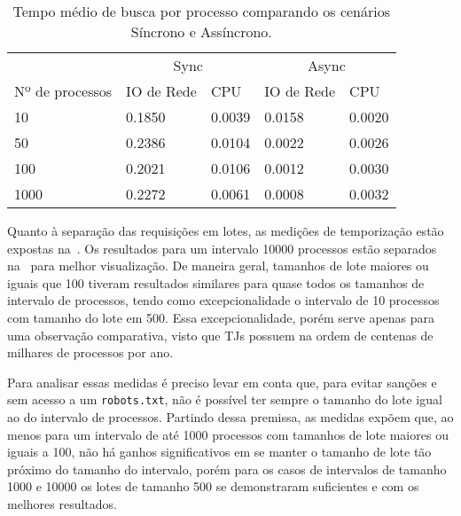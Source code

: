 \begin{table}[htb]
  \centering
  \begin{tabular}{lllll}
    \toprule
     & \multicolumn{2}{c}{Sync} & \multicolumn{2}{c}{Async} \\
    Nº de processos & IO de Rede & CPU & IO de Rede & CPU \\
    \midrule
    10 & 0.1850 & 0.0039 & 0.0158 & 0.0020 \\
    50 & 0.2386 & 0.0104 & 0.0022 & 0.0026 \\
    100 & 0.2021 & 0.0106 & 0.0012 & 0.0030 \\
    1000 & 0.2272 & 0.0061 & 0.0008 & 0.0032 \\
    \bottomrule
  \end{tabular}
  \caption{%
    Tempo médio de busca por processo comparando os cenários Síncrono e
    Assíncrono.
  }
  \label{tbl:tempos-async-vs-sync}
\end{table}

Quanto à separação das requisições em lotes, as medições de temporização estão
expostas na~. Os resultados para um
intervalo 10000 processos estão separados
na~ para melhor
visualização. De maneira geral, tamanhos de lote maiores ou iguais que 100
tiveram resultados similares para quase todos os tamanhos de intervalo de
processos, tendo como excepcionalidade o intervalo de 10 processos com tamanho
do lote em 500. Essa excepcionalidade, porém serve apenas para uma observação
comparativa, visto que TJs possuem na ordem de centenas de milhares de
processos por ano.

Para analisar essas medidas é preciso levar em conta que, para evitar sanções e
sem acesso a um \texttt{robots.txt}, não é possível ter sempre o tamanho do
lote igual ao do intervalo de processos. Partindo dessa premissa, as medidas
expõem que, ao menos para um intervalo de até 1000 processos com tamanhos de
lote maiores ou iguais a 100, não há ganhos significativos em se manter o
tamanho de lote tão próximo do tamanho do intervalo, porém para os casos de
intervalos de tamanho 1000 e 10000 os lotes de tamanho 500 se demonstraram
suficientes e com os melhores resultados.

